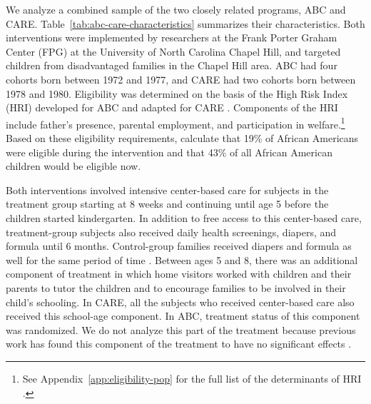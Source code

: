 We analyze a combined sample of the two closely related programs, ABC and CARE. Table~\ref{tab:abc-care-characteristics} summarizes their characteristics. Both interventions were implemented by researchers at the Frank Porter Graham Center (FPG) at the University of North Carolina Chapel Hill, and targeted children from disadvantaged families in the Chapel Hill area. ABC had four cohorts born between 1972 and 1977, and CARE had two cohorts born between 1978 and 1980. Eligibility was determined on the basis of the High Risk Index (HRI) developed for ABC and adapted for CARE \citep{Ramey_Smith_1977_AJMD,Wasik_Ramey_etal_1990_CD}. Components of the HRI include father's presence, parental employment, and participation in welfare.\footnote{See Appendix~\ref{app:eligibility-pop} for the full list of the determinants of HRI \citep{Ramey_Smith_1977_AJMD, Wasik_Ramey_etal_1990_CD, Ramey_Campbell_1991_childreninpoverty}.} Based on these eligibility requirements, \citet{Garcia_Heckman_Leaf_etal_2017_Comp_CBA_Unpublished} calculate that 19\% of African Americans were eligible during the intervention and that 43\% of all African American children would be eligible now.

Both interventions involved intensive center-based care for subjects in the treatment group starting at 8 weeks and continuing until age 5 before the children started kindergarten. In addition to free access to this center-based care, treatment-group subjects also received daily health screenings, diapers, and formula until 6 months. Control-group families received diapers and formula as well for the same period of time \citep{Wasik_Ramey_etal_1990_CD,Ramey_Campbell_1991_childreninpoverty}. Between ages 5 and 8, there was an additional component of treatment in which home visitors worked with children and their parents to tutor the children and to encourage families to be involved in their child's schooling. In CARE, all the subjects who received center-based care also received this school-age component. In ABC, treatment status of this component was randomized. We do not analyze this part of the treatment because previous work has found this component of the treatment to have no significant effects \citep{Campbell_Ramey_etal_2002_ADS,Campbell_Conti_etal_2014_EarlyChildhoodInvestments}.

